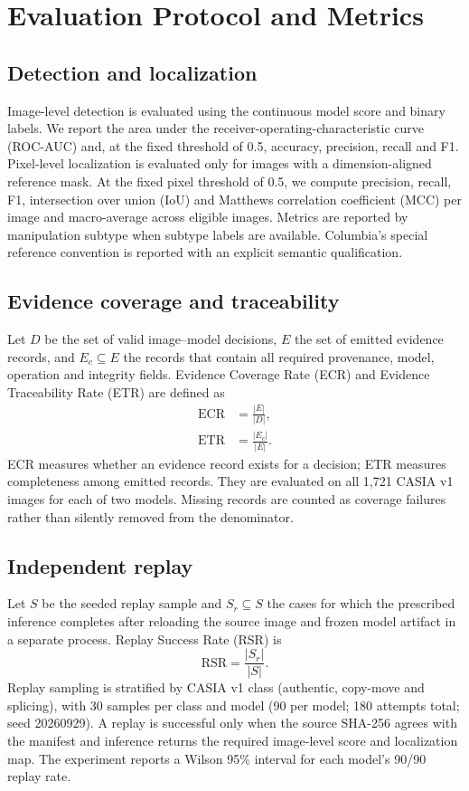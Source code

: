\section{Evaluation Protocol and Metrics}

\subsection{Detection and localization}
Image-level detection is evaluated using the continuous model score and binary labels. We report the area under the receiver-operating-characteristic curve (ROC-AUC) and, at the fixed threshold of 0.5, accuracy, precision, recall and F1. Pixel-level localization is evaluated only for images with a dimension-aligned reference mask. At the fixed pixel threshold of 0.5, we compute precision, recall, F1, intersection over union (IoU) and Matthews correlation coefficient (MCC) per image and macro-average across eligible images. Metrics are reported by manipulation subtype when subtype labels are available. Columbia's special reference convention is reported with an explicit semantic qualification.

\subsection{Evidence coverage and traceability}
Let $D$ be the set of valid image--model decisions, $E$ the set of emitted evidence records, and $E_c\subseteq E$ the records that contain all required provenance, model, operation and integrity fields. Evidence Coverage Rate (ECR) and Evidence Traceability Rate (ETR) are defined as
\begin{align}
\mathrm{ECR} &= \frac{|E|}{|D|}, \\
\mathrm{ETR} &= \frac{|E_c|}{|E|}.
\end{align}
ECR measures whether an evidence record exists for a decision; ETR measures completeness among emitted records. They are evaluated on all 1,721 CASIA v1 images for each of two models. Missing records are counted as coverage failures rather than silently removed from the denominator.

\subsection{Independent replay}
Let $S$ be the seeded replay sample and $S_r\subseteq S$ the cases for which the prescribed inference completes after reloading the source image and frozen model artifact in a separate process. Replay Success Rate (RSR) is
\begin{equation}
\mathrm{RSR}=\frac{|S_r|}{|S|}.
\end{equation}
Replay sampling is stratified by CASIA v1 class (authentic, copy-move and splicing), with 30 samples per class and model (90 per model; 180 attempts total; seed 20260929). A replay is successful only when the source SHA-256 agrees with the manifest and inference returns the required image-level score and localization map. The experiment reports a Wilson 95\% interval for each model's 90/90 replay rate.

